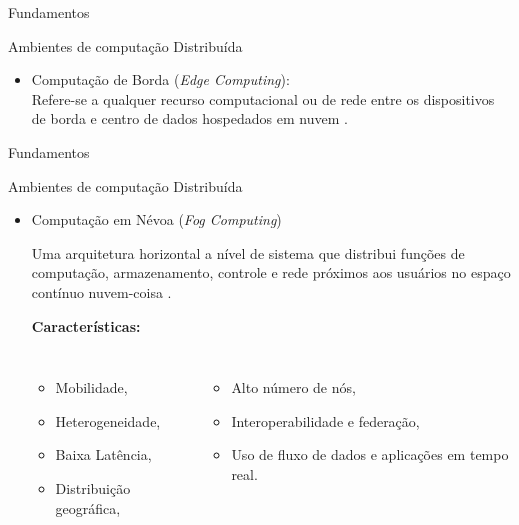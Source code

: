 \documentclass[aspectratio=43,10pt]{beamer}
\begin{document}
\begin{frame}[fragile]{Fundamentos}
  \begin{alertblock}{Ambientes de computação Distribuída}
  \begin{itemize}
    
  \item Computação de Borda (\emph{Edge Computing}):
  \\ Refere-se a qualquer recurso computacional ou de rede entre os dispositivos
  de borda e centro de dados hospedados em nuvem \cite{Shi2016}.
\end{itemize}
\end{alertblock}
\end{frame}

\begin{frame}[fragile]{Fundamentos}
  \begin{alertblock}{Ambientes de computação Distribuída}
  \begin{itemize}
  \item Computação em Névoa (\emph{Fog Computing})
  
  
  
  Uma arquitetura horizontal a nível de sistema que distribui funções de
  computação, armazenamento, controle e rede próximos aos usuários no espaço
  contínuo nuvem-coisa \cite{IEEECommunicationsSociety2018}.
  
  \textbf{Características:}
  \begin{columns}[T,onlytextwidth]
    \begin{itemize}
      \item Mobilidade,
      \item Heterogeneidade,
      \item Baixa Latência,
      \item Distribuição geográfica,
    \end{itemize}
    \begin{itemize}
      \item Alto número de nós,
      \item Interoperabilidade e federação,
      \item Uso de fluxo de dados e aplicações em tempo real.
    \end{itemize}
  \end{columns}
\end{itemize}
\end{alertblock}
\end{frame}
\end{document}
